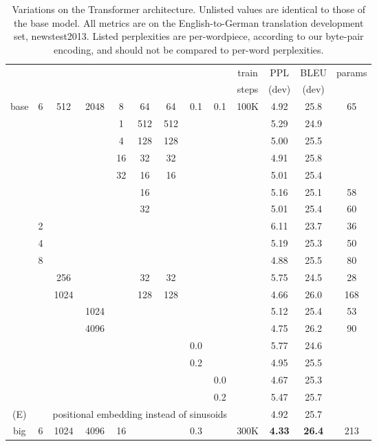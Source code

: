 \documentclass{article}
\begin{document}
\begin{table}[t]
\caption{Variations on the Transformer architecture. Unlisted values are identical to those of the base model.  All metrics are on the English-to-German translation development set, newstest2013.  Listed perplexities are per-wordpiece, according to our byte-pair encoding, and should not be compared to per-word perplexities.}
\label{tab:variations}
\begin{center}
\vspace{-2mm}
\begin{tabular}{c|ccccccccc|ccc}
\hline\rule{0pt}{2.0ex}
 & \multirow{2}{*}{} & \multirow{2}{*}{} &
\multirow{2}{*}{} & \multirow{2}{*}{} & 
\multirow{2}{*}{} & \multirow{2}{*}{} & 
\multirow{2}{*}{} & \multirow{2}{*}{} &
train & PPL & BLEU & params \\
 & & & & & & & & & steps & (dev) & (dev) &  \\
\hline\rule{0pt}{2.0ex}
base & 6 & 512 & 2048 & 8 & 64 & 64 & 0.1 & 0.1 & 100K & 4.92 & 25.8 & 65 \\
\hline\rule{0pt}{2.0ex}
\multirow{4}{*}{(A)}
& & & & 1 & 512 & 512 & & & & 5.29 & 24.9 &  \\
& & & & 4 & 128 & 128 & & & & 5.00 & 25.5 &  \\
& & & & 16 & 32 & 32 & & & & 4.91 & 25.8 &  \\
& & & & 32 & 16 & 16 & & & & 5.01 & 25.4 &  \\
\hline\rule{0pt}{2.0ex}
\multirow{2}{*}{(B)}
& & & & & 16 & & & & & 5.16 & 25.1 & 58 \\
& & & & & 32 & & & & & 5.01 & 25.4 & 60 \\
\hline\rule{0pt}{2.0ex}
\multirow{7}{*}{(C)}
& 2 & & & & & & & &            & 6.11 & 23.7 & 36 \\
& 4 & & & & & & & &            & 5.19 & 25.3 & 50 \\
& 8 & & & & & & & &            & 4.88 & 25.5 & 80 \\
& & 256 & & & 32 & 32 & & &    & 5.75 & 24.5 & 28 \\
& & 1024 & & & 128 & 128 & & & & 4.66 & 26.0 & 168 \\
& & & 1024 & & & & & &         & 5.12 & 25.4 & 53 \\
& & & 4096 & & & & & &         & 4.75 & 26.2 & 90 \\
\hline\rule{0pt}{2.0ex}
\multirow{4}{*}{(D)}
& & & & & & & 0.0 & & & 5.77 & 24.6 &  \\
& & & & & & & 0.2 & & & 4.95 & 25.5 &  \\
& & & & & & & & 0.0 & & 4.67 & 25.3 &  \\
& & & & & & & & 0.2 & & 5.47 & 25.7 &  \\
\hline\rule{0pt}{2.0ex}
(E) & & \multicolumn{7}{c}{positional embedding instead of sinusoids} & & 4.92 & 25.7 & \\
\hline\rule{0pt}{2.0ex}
big & 6 & 1024 & 4096 & 16 & & & 0.3 & & 300K & \textbf{4.33} & \textbf{26.4} & 213 \\
\hline
\end{tabular}
\end{center}
\end{table}
\end{document}
